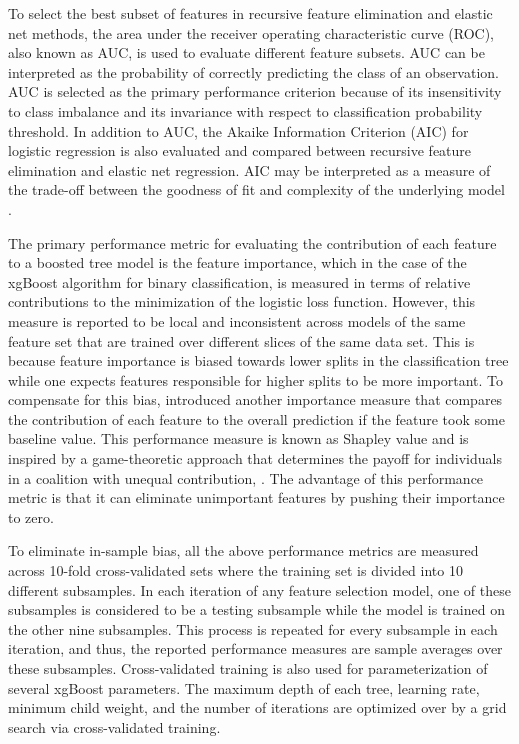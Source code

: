 \documentclass[10pt,a4paper]{article}
\begin{document}
To select the best subset of features in recursive feature elimination and elastic net methods, the area under the receiver operating characteristic curve (ROC), also known as AUC, is used to evaluate different feature subsets. AUC can be interpreted as the probability of correctly predicting the class of an observation. AUC is selected as the primary performance criterion because of its insensitivity to class imbalance and its invariance with respect to classification probability threshold. In addition to AUC, the Akaike Information Criterion (AIC) for logistic regression is also evaluated and compared between recursive feature elimination and elastic net regression. AIC may be interpreted as a measure of the trade-off between the goodness of fit and complexity of the underlying model \citep{hastie2009elements}.

The primary performance metric for evaluating the contribution of each feature to a boosted tree model is the feature importance, which in the case of the xgBoost algorithm for binary classification, is measured in terms of relative contributions to the minimization of the logistic loss function. However, this measure is reported to be local and inconsistent across models of the same feature set that are trained over different slices of the same data set. This is because feature importance is biased towards lower splits in the classification tree while one expects features responsible for higher splits to be more important. To compensate for this bias, \cite{NIPS2017_7062} introduced another importance measure that compares the contribution of each feature to the overall prediction if the feature took some baseline value. This performance measure is known as Shapley value and is inspired by a game-theoretic approach that determines the payoff for individuals in a coalition with unequal contribution, \cite{shapley1953value}. The advantage of this performance metric is that it can eliminate unimportant features by pushing their importance to zero. 

To eliminate in-sample bias, all the above performance metrics are measured across 10-fold cross-validated sets where the training set is divided into 10 different subsamples. In each iteration of any feature selection model, one of these subsamples is considered to be a testing subsample while the model is trained on the other nine subsamples. This process is repeated for every subsample in each iteration, and thus, the reported performance measures are sample averages over these subsamples. Cross-validated training is also used for parameterization of several xgBoost parameters. The maximum depth of each tree, learning rate, minimum child weight, and the number of iterations are optimized over by a grid search via cross-validated training.
\end{document}
